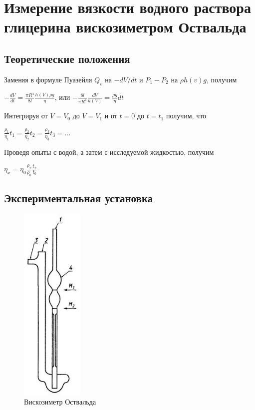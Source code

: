 \documentclass[a4paper]{article}
\begin{document}
    \section{Измерение вязкости водного раствора глицерина вискозиметром Оствальда}
    
    \subsection{Теоретические положения}
    
    Заменяя в формуле Пуазейля $Q_v$ на $-dV/dt$ и $P_1 - P_2$ на $\rho h(v) g$, получим 
    \begin{center}
    $-\frac{dV}{dt} = \frac{\pi R^4}{8l}\frac{h(V)\rho g}{\eta}$, или $-\frac{8l}{\pi R^4}\frac{dV}{h(V)} = \frac{\rho g}{\eta}dt$
    \end{center}
    Интегрируя от $V = V_0$ до $V = V_1$ и от $t = 0$ до $t = t_1$ получим, что
    \begin{center}
    $\frac{\rho_1}{\eta_1}t_1 = \frac{\rho_2}{\eta_2}t_2 = \frac{\rho_3}{\eta_3}t_3 = ...$
    \end{center}
    
    Проведя опыты с водой, а затем с исследуемой жидкостью, получим
    \begin{center}
    $\eta_x = \eta_0\frac{\rho_x}{\rho_0}\frac{t_x}{t_0}$
    \end{center}
    
    \subsection{Экспериментальная установка}
    
    \begin{figure}[t]
    \centering
    \includegraphics[width=30mm]{setup2.jpg}
    \caption{Вискозиметр Оствальда}
    \label{fig:vac}
    \end{figure}
    
\end{document}
